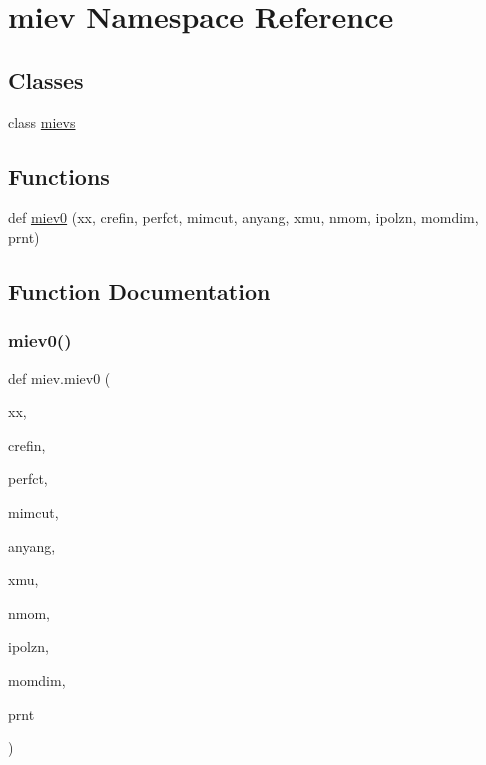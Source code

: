 \hypertarget{namespacemiev}{}\section{miev Namespace Reference}
\label{namespacemiev}
\subsection*{Classes}
\begin{DoxyCompactItemize}
\item 
class \hyperlink{classmiev_1_1mievs}{mievs}
\end{DoxyCompactItemize}
\subsection*{Functions}
\begin{DoxyCompactItemize}
\item 
def \hyperlink{namespacemiev_a8cda9421698315ea438d81bbfdc5eb2d}{miev0} (xx, crefin, perfct, mimcut, anyang, xmu, nmom, ipolzn, momdim, prnt)
\end{DoxyCompactItemize}


\subsection{Function Documentation}
\mbox{\label{namespacemiev_a8cda9421698315ea438d81bbfdc5eb2d}} 
\subsubsection{\texorpdfstring{miev0()}{miev0()}}
{\footnotesize\ttfamily def miev.\+miev0 (\begin{DoxyParamCaption}\item[{}]{xx,  }\item[{}]{crefin,  }\item[{}]{perfct,  }\item[{}]{mimcut,  }\item[{}]{anyang,  }\item[{}]{xmu,  }\item[{}]{nmom,  }\item[{}]{ipolzn,  }\item[{}]{momdim,  }\item[{}]{prnt }\end{DoxyParamCaption})}

